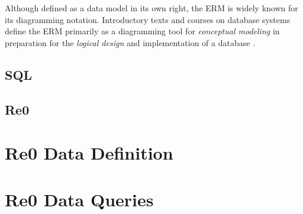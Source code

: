 \documentclass[a4paper,10pt]{article}
\begin{document}
Although defined as a data model in its own right, the ERM is widely known for its diagramming notation. 
Introductory texts and courses on database systems define the ERM primarily as a diagramming tool for \emph{conceptual modeling} in preparation for the \emph{logical design} and implementation of a database \citep{elmasri-2015-fundamentals, coronel-2016-database}.


\subsection{SQL}

\subsection{Re0}

\section{Re0 Data Definition}

\section{Re0 Data Queries}


\end{document}
